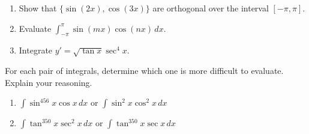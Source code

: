 \documentclass{exercises}
\begin{document}
\begin{enumerate}[resume]
\item Show that $\{\sin(2x),\cos(3x)\}$ are orthogonal over the interval $[-\pi,\pi]$.
\item Evaluate $\int_{-\pi}^{\pi}\sin(mx)\cos(nx)\,dx$.
\item Integrate $y'=\sqrt{\tan x}\sec^{4}x$.
\end{enumerate}

For each pair of integrals, determine which one is more difficult to evaluate. Explain your reasoning.

\begin{enumerate}[resume]
\item $\int \sin^{456}x\cos x\,dx$ or $\int \sin^{2}x\cos^{2}x\,dx$
\item $\int \tan^{350}x\sec^{2}x\,dx$ or $\int \tan^{350}x\sec x\,dx$
\end{enumerate}
\end{document}
